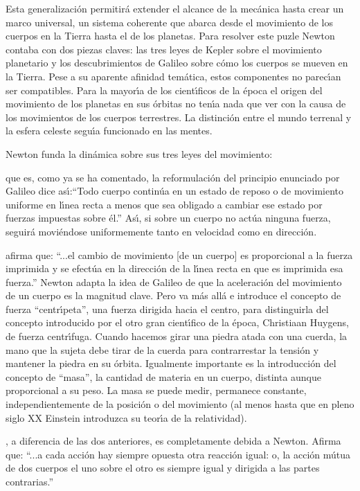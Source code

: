 Esta generalizaci\'on permitir\'a extender el alcance de la mec\'anica hasta crear un marco universal, un sistema coherente que abarca desde el movimiento de los cuerpos en la Tierra  hasta el de los planetas. Para resolver este puzle Newton contaba con dos piezas claves: las tres leyes de Kepler sobre el movimiento planetario y los descubrimientos de Galileo sobre c\'omo los cuerpos se mueven en la Tierra. Pese a su aparente afinidad tem\'atica, estos componentes no parec\'\i{}an ser compatibles. Para la mayor\'\i{}a de los cient\'\i{}ficos de la \'epoca el origen del movimiento de los planetas en sus \'orbitas no ten\'\i{}a nada que ver con la causa de los movimientos de los cuerpos terrestres. La distinci\'on entre el mundo terrenal y la esfera celeste segu\'\i{}a funcionado en las mentes.

Newton funda la din\'amica sobre sus tres leyes del movimiento:

 que es, como ya se ha comentado, la reformulaci\'on del principio enunciado por Galileo dice as\'\i{}:``Todo cuerpo contin\'ua en un estado de reposo o de movimiento uniforme en l\'\i{}nea recta a menos que sea obligado a cambiar ese estado por fuerzas impuestas sobre \'el.'' As\'\i{}, si sobre un cuerpo no act\'ua ninguna fuerza, seguir\'a movi\'endose uniformemente tanto en velocidad como en direcci\'on.

 afirma que: ``...el cambio de movimiento [de un cuerpo] es proporcional a la fuerza imprimida y se efect\'ua en la direcci\'on de la l\'\i{}nea recta en que es imprimida esa fuerza.'' Newton adapta la idea de Galileo de que la aceleraci\'on del movimiento de un cuerpo es la magnitud clave. Pero va m\'as all\'a e introduce el concepto de fuerza ``centr\'\i{}peta'', una fuerza dirigida hacia el centro, para distinguirla del concepto introducido por el otro gran cient\'\i{}fico de la \'epoca, Christiaan Huygens, de fuerza centr\'\i{}fuga. Cuando hacemos girar una piedra atada con una cuerda, la mano que la sujeta debe tirar de la cuerda para contrarrestar la tensi\'on y mantener la piedra en su \'orbita. Igualmente importante es la introducci\'on del concepto de ``masa'', la cantidad de materia en un cuerpo, distinta aunque proporcional a su peso. La masa se puede medir, permanece constante, independientemente de la posici\'on o del movimiento (al menos hasta que en pleno siglo XX Einstein introduzca su teor\'\i{}a de la relatividad).

, a diferencia de las dos anteriores, es completamente debida a Newton. Afirma que: ``...a cada acci\'on hay siempre opuesta otra reacci\'on igual: o, la acci\'on m\'utua de dos cuerpos el uno sobre el otro es siempre igual y dirigida a las partes contrarias.'' 


